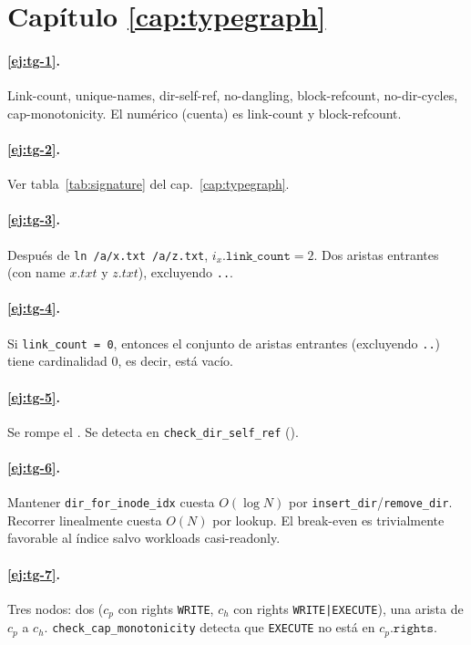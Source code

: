 \section*{Capítulo \ref{cap:typegraph}}

\paragraph{\ref{ej:tg-1}.} Link-count, unique-names, dir-self-ref,
no-dangling, block-refcount, no-dir-cycles, cap-monotonicity. El
numérico (cuenta) es link-count y block-refcount.

\paragraph{\ref{ej:tg-2}.} Ver tabla~\ref{tab:signature} del
cap.~\ref{cap:typegraph}.

\paragraph{\ref{ej:tg-3}.} Después de \texttt{ln /a/x.txt /a/z.txt},
$i_x.\texttt{link\_count} = 2$. Dos aristas \econtains{} entrantes
(con name $x.txt$ y $z.txt$), excluyendo \texttt{..}.

\paragraph{\ref{ej:tg-4}.} Si \texttt{link\_count = 0}, entonces el
conjunto de aristas \econtains{} entrantes (excluyendo \texttt{..})
tiene cardinalidad 0, es decir, está vacío.

\paragraph{\ref{ej:tg-5}.} Se rompe el . Se
detecta en \texttt{check\_dir\_self\_ref}
().

\paragraph{\ref{ej:tg-6}.} Mantener \texttt{dir\_for\_inode\_idx} cuesta
$O(\log N)$ por \texttt{insert\_dir}/\texttt{remove\_dir}. Recorrer
linealmente cuesta $O(N)$ por lookup. El break-even es trivialmente
favorable al índice salvo workloads casi-readonly.

\paragraph{\ref{ej:tg-7}.} Tres nodos: dos \Cap{} ($c_p$ con rights
\texttt{WRITE}, $c_h$ con rights \texttt{WRITE|EXECUTE}), una arista
\edelegates{} de $c_p$ a $c_h$. \texttt{check\_cap\_monotonicity}
detecta que \texttt{EXECUTE} no está en $c_p.\texttt{rights}$.

